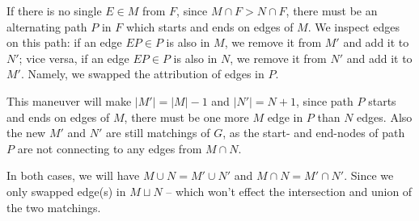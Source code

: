 \documentclass[11pt]{article}
\begin{document}
If there is no single $E \in M$ from $F$, since $M \cap F > N \cap F$, there must be an alternating path $P$ in $F$ which starts and ends on edges of $M$. We inspect edges on this path: if an edge $EP \in P$ is also in $M$, we remove it from $M'$ and add it to $N'$; vice versa, if an edge $EP \in P$ is also in $N$, we remove it from $N'$ and add it to $M'$. Namely, we swapped the attribution of edges in $P$.

This maneuver will make $|M'| = |M| - 1$ and $|N'| = N + 1$, since path $P$ starts and ends on edges of $M$, there must be one more $M$ edge in $P$ than $N$ edges. Also the new $M'$ and $N'$ are still matchings of $G$, as the start- and end-nodes of path $P$ are not connecting to any edges from $M \cap N$.\newline


In both cases, we will have $M \cup N = M' \cup N'$ and $M \cap N = M' \cap N'$. Since we only swapped edge(s) in $M \sqcup N$ -- which won't effect the intersection and union of the two matchings.\newline





%
% 
% 
\end{document}
